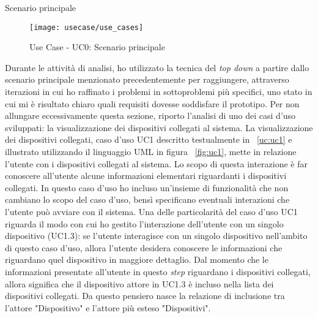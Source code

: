 \begin{usecase}{0}{Scenario principale}
\label{uc:scenario-principale}
\end{usecase}

\begin{figure}[!h]
    \centering
    \texttt{[image: usecase/use\_cases]}
    \caption{Use Case - UC0: Scenario principale}
    \label{fig:scenario-principale}
\end{figure}

Durante le attività di analisi, ho utilizzato la tecnica del \emph{top down} a partire dallo scenario principale menzionato precedentemente per raggiungere, attraverso iterazioni in cui ho raffinato i problemi in sottoproblemi più specifici, uno stato in cui mi è risultato chiaro quali requisiti dovesse soddisfare il prototipo.
Per non allungare eccessivamente questa sezione, riporto l'analisi di uno dei casi d'uso sviluppati: la visualizzazione dei dispositivi collegati al sistema.
La visualizzazione dei dispositivi collegati, caso d'uso UC1 descritto testualmente in ~\ref{uc:uc1} e illustrato utilizzando il linguaggio UML in figura ~\ref{fig:uc1}, mette in relazione l'utente con i dispositivi collegati al sistema. Lo scopo di questa interazione è far conoscere all'utente alcune informazioni elementari riguardanti i dispositivi collegati. In questo caso d'uso ho incluso un'insieme di funzionalità che non cambiano lo scopo del caso d'uso, bensì specificano eventuali interazioni che l'utente può avviare con il sistema. Una delle particolarità del caso d'uso UC1 riguarda il modo con cui ho gestito l'interazione dell'utente con un singolo dispositivo (UC1.3): se l'utente interagisce con un singolo dispositivo nell'ambito di questo caso d'uso, allora l'utente desidera conoscere le informazioni che riguardano quel dispositivo in maggiore dettaglio. Dal momento che le informazioni presentate all'utente in questo \emph{step} riguardano i dispositivi collegati, allora significa che il dispositivo attore in UC1.3 è incluso nella lista dei dispositivi collegati. Da questo pensiero nasce la relazione di inclusione tra l'attore "Dispositivo" e l'attore più esteso "Dispositivi".


